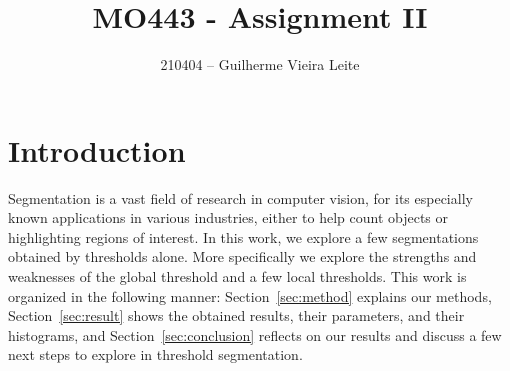 \documentclass[conference]{IEEEtran}
\begin{document}
\title{MO443 - Assignment II}

\author{210404 -- Guilherme Vieira Leite}

\maketitle

\section{Introduction}
Segmentation is a vast field of research in computer vision, for its especially known applications in various industries, either to help count objects or highlighting regions of interest. In this work, we explore a few segmentations obtained by thresholds alone. More specifically we explore the strengths and weaknesses of the global threshold and a few local thresholds. This work is organized in the following manner: Section~\ref{sec:method} explains our methods, Section~\ref{sec:result} shows the obtained results, their parameters, and their histograms, and Section~\ref{sec:conclusion} reflects on our results and discuss a few next steps to explore in threshold segmentation.
\end{document}
